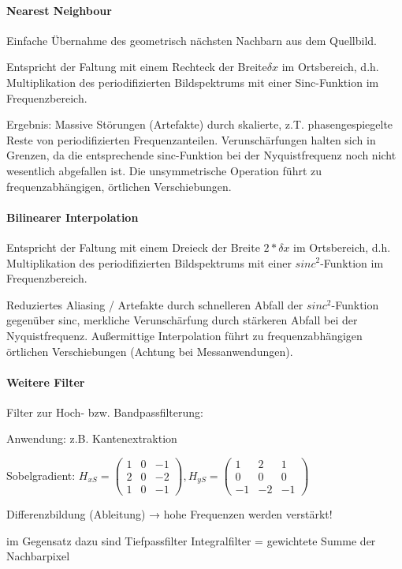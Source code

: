 \documentclass[landscape]{article}
\begin{document}
\begin{multicols}{3}
  \paragraph{Nearest Neighbour}
  \begin{itemize*}
    \item Einfache Übernahme des geometrisch nächsten Nachbarn aus dem Quellbild.
    \item Entspricht der Faltung mit einem Rechteck der Breite$\delta x$ im Ortsbereich, d.h. Multiplikation des periodifizierten Bildspektrums mit einer Sinc-Funktion im Frequenzbereich.
    \item Ergebnis: Massive Störungen (Artefakte) durch skalierte, z.T. phasengespiegelte Reste von periodifizierten Frequenzanteilen. Verunschärfungen halten sich in Grenzen, da die entsprechende sinc-Funktion bei der Nyquistfrequenz noch nicht wesentlich abgefallen ist. Die unsymmetrische Operation führt zu frequenzabhängigen, örtlichen Verschiebungen.
  \end{itemize*}
  
  \paragraph{Bilinearer Interpolation}
  \begin{itemize*}
    \item Entspricht der Faltung mit einem Dreieck der Breite $2*\delta x$ im Ortsbereich, d.h. Multiplikation des periodifizierten Bildspektrums mit einer $sinc^2$-Funktion im Frequenzbereich.
    \item Reduziertes Aliasing / Artefakte durch schnelleren Abfall der $sinc^2$-Funktion gegenüber sinc, merkliche Verunschärfung durch stärkeren Abfall bei der Nyquistfrequenz. Außermittige Interpolation führt zu frequenzabhängigen örtlichen Verschiebungen (Achtung bei Messanwendungen).
  \end{itemize*}
  
  \paragraph{Weitere Filter}
  \begin{itemize*}
    \item Filter zur Hoch- bzw. Bandpassfilterung:
    \item Anwendung: z.B. Kantenextraktion
    \item Sobelgradient: $H_{xS} =\begin{pmatrix} 1&0&-1\\ 2&0&-2\\ 1&0&-1\end{pmatrix}, H_{yS}=\begin{pmatrix} 1&2&1\\ 0&0&0\\ -1&-2&-1 \end{pmatrix}$
    \item Differenzbildung (Ableitung) → hohe Frequenzen werden verstärkt!
    \item im Gegensatz dazu sind Tiefpassfilter Integralfilter = gewichtete Summe der Nachbarpixel
  \end{itemize*}
  
  
\end{multicols}
\end{document}
